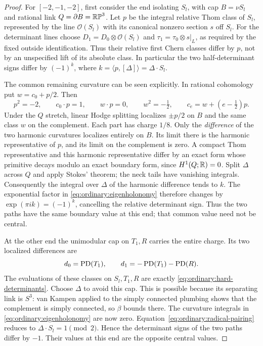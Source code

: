 \begin{proof}
For $[-2,-1,-2]$, first consider the end isolating
$S_l$, with cap $B=\nu S_l$ and rational link
$Q=\partial B=\mathbb{RP}^3$.  Let $p$ be the integral relative
Thom class of $S_l$, represented by the line $\mathcal O(S_l)$
with its canonical nonzero section $s$ off $S_l$.
For the determinant lines choose
$D_1=D_0\otimes\mathcal O(S_l)$ and
$\tau_1=\tau_0\otimes s|_L$, as required by the fixed
outside identification.  Thus their relative first Chern
classes differ by $p$, not by an unspecified lift of its
absolute class.  In particular the two half-determinant
signs differ by $(-1)^k$, where
$k=\langle p,[\Delta]\rangle=\Delta\cdot S_l$.

The common remaining curvature can be seen explicitly.
In rational cohomology put $w=c_0+p/2$.  Then
\[
 p^2=-2,\qquad c_0\cdot p=1,\qquad
 w\cdot p=0,\qquad w^2=-\tfrac12,\qquad
 c_e=w+(e-\tfrac12)p.
\]
Under the $Q$ stretch, linear Hodge splitting localizes
$\pm p/2$ on $B$ and the same class $w$ on the complement.
Each part has charge $1/8$.  Only the \emph{difference}
of the two harmonic curvatures localizes entirely on $B$.
Its limit there is the harmonic representative of $p$,
and its limit on the complement is zero.  A compact
Thom representative and this harmonic representative
differ by an exact form whose primitive decays modulo
an exact boundary form, since $H^1(Q;\mathbb R)=0$.
Split $\Delta$ across $Q$ and apply Stokes' theorem;
the neck tails have vanishing integrals.  Consequently
the integral over $\Delta$ of the harmonic difference
tends to $k$.  The exponential factor in
\eqref{eq:ordinary:eigenholonomy} therefore changes by
$\exp(\pi i k)=(-1)^k$, cancelling the relative
determinant sign.
Thus the two paths have the same boundary value at
this end; that common value need not be central.

At the other end the unimodular cap on $T_1,R$ carries
the entire charge.  Its two localized differences are
\begin{equation}\label{eq:ordinary:unimodular-localization}
 d_0=\operatorname{PD}(T_1),\qquad d_1=-\operatorname{PD}(T_1)-\operatorname{PD}(R).
\end{equation}
The evaluations of these classes on $S_l,T_1,R$
are exactly \eqref{eq:ordinary:hard-determinants}.
Choose $\Delta$ to avoid this cap.  This is possible
because its separating link is $S^3$: van Kampen
applied to the simply connected plumbing shows that
the complement is simply connected, so $\beta$ bounds
there.  The curvature integrals in
\eqref{eq:ordinary:eigenholonomy} are now zero.
Equation~\eqref{eq:ordinary:radical-pairing} reduces
to $\Delta\cdot S_l=1\pmod2$.  Hence the determinant
signs of the two paths differ by $-1$.  Their values
at this end are the opposite central values.


\end{proof}
